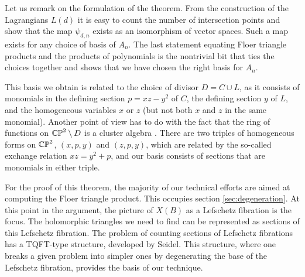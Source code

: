 \documentclass[12pt]{amsart}
\begin{document}
Let us remark on the formulation of the theorem. From the construction
of the Lagrangians $L(d)$ it is easy to count the number of
intersection points and show that the map $\psi_{d,n}$ exists as an
isomorphism of vector spaces. Such a map exists for any choice of
basis of $A_n$. The last statement equating Floer triangle products
and the products of polynomials is the nontrivial bit that ties the
choices together and shows that we have chosen the right basis for
$A_n$. 

This basis we obtain is related to the choice of divisor $D = C\cup L$, as it consists of monomials in the defining section $p =xz-y^2$ of $C$, the defining section $y$ of $L$, and the homogeneous variables $x$ or $z$ (but not both $x$ and $z$ in the same monomial). Another point of view has to do with the fact that the ring of functions on $\mathbb{CP}^2\setminus D$ is a cluster algebra \cite{fomin-zelevinsky-I}. There are two triples of homogeneous forms on $\mathbb{CP}^2$, $(x,p,y)$ and $(z,p,y)$, which are related by the so-called exchange relation $xz = y^2 + p$, and our basis consists of sections that are monomials in either triple. 

For the proof of this theorem, the majority of our technical efforts
are aimed at computing the Floer triangle product. This occupies
section \ref{sec:degeneration}. At this point in the argument, the
picture of $X(B)$ as a Lefschetz fibration is the focus. The
holomorphic triangles we need to find can be represented as sections
of this Lefschetz fibration. The problem of counting sections of
Lefschetz fibrations has a TQFT-type structure, developed by
Seidel. This structure, where one breaks a given problem into simpler
ones by degenerating the base of the Lefschetz fibration, provides the
basis of our technique.
\end{document}
